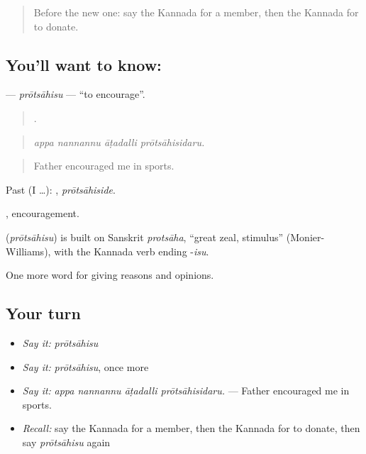 \label{lesson:KA-C404-protsahisu}



\begin{quote}
Before the new one: say the Kannada for a member, then the Kannada for to donate.
\end{quote}

\subsection*{You'll want to know: }
\textbf{} — \emph{prōtsāhisu} — \textquotedblleft{}to encourage\textquotedblright{}.

\begin{quote}
   .
\end{quote}

\begin{quote}
\emph{appa nannannu āṭadalli prōtsāhisidaru.}
\end{quote}

\begin{quote}
Father encouraged me in sports.
\end{quote}

Past (I …): , \emph{prōtsāhiside}.

, encouragement.

\begin{cousinweb}
\textbf{} (\emph{prōtsāhisu}) is built on Sanskrit \emph{protsāha}, \textquotedblleft{}great zeal, stimulus\textquotedblright{} (Monier-Williams), with the Kannada verb ending -\emph{isu}.
\end{cousinweb}

\begin{grammarlens}[title={What you've built}]
One more word for giving reasons and opinions.
\end{grammarlens}

\subsection*{Your turn}
\begin{itemize}
\raggedright
  \item \emph{Say it:} \emph{prōtsāhisu}
  \item \emph{Say it:} \emph{prōtsāhisu}, once more
  \item \emph{Say it:} \emph{appa nannannu āṭadalli prōtsāhisidaru.} — Father encouraged me in sports.
  \item \emph{Recall:} say the Kannada for a member, then the Kannada for to donate, then say \emph{prōtsāhisu} again
\end{itemize}

